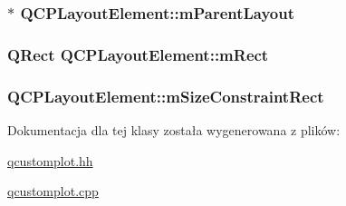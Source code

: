 \subsubsection[{\texorpdfstring{m\+Parent\+Layout}{mParentLayout}}]{$\ast$ Q\+C\+P\+Layout\+Element\+::m\+Parent\+Layout\hspace{0.3cm}{\ttfamily [protected]}}\hypertarget{class_q_c_p_layout_element_ae7c75c25549608bd688bdb65d4c38066}{}\label{class_q_c_p_layout_element_ae7c75c25549608bd688bdb65d4c38066}
\subsubsection[{\texorpdfstring{m\+Rect}{mRect}}]{\setlength{\rightskip}{0pt plus 5cm}Q\+Rect Q\+C\+P\+Layout\+Element\+::m\+Rect\hspace{0.3cm}{\ttfamily [protected]}}\hypertarget{class_q_c_p_layout_element_ad8896f05550389f7b9e92c9e6cdf6e01}{}\label{class_q_c_p_layout_element_ad8896f05550389f7b9e92c9e6cdf6e01}
\subsubsection[{\texorpdfstring{m\+Size\+Constraint\+Rect}{mSizeConstraintRect}}]{ Q\+C\+P\+Layout\+Element\+::m\+Size\+Constraint\+Rect\hspace{0.3cm}{\ttfamily [protected]}}\hypertarget{class_q_c_p_layout_element_acc012635b1ae178ff3c4da8a3af303a2}{}\label{class_q_c_p_layout_element_acc012635b1ae178ff3c4da8a3af303a2}


Dokumentacja dla tej klasy została wygenerowana z plików\+:\begin{DoxyCompactItemize}
\item 
\hyperlink{qcustomplot_8hh}{qcustomplot.\+hh}\item 
\hyperlink{qcustomplot_8cpp}{qcustomplot.\+cpp}\end{DoxyCompactItemize}
